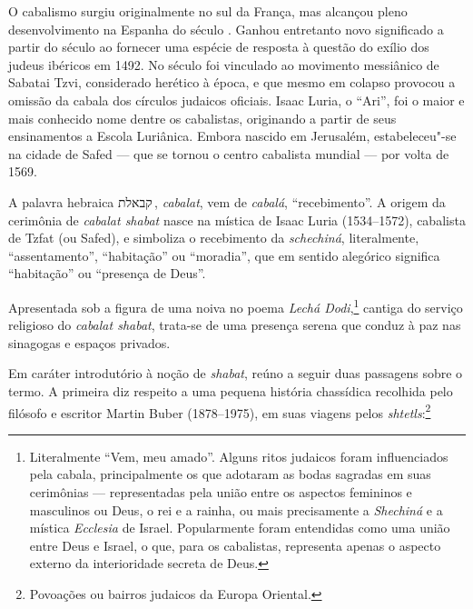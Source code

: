 O cabalismo surgiu originalmente no sul da França, mas alcançou pleno
desenvolvimento na Espanha do século .  Ganhou entretanto
novo significado a partir do século  ao fornecer uma
espécie de resposta à questão do exílio dos judeus ibéricos em 1492. No
século  foi vinculado ao movimento messiânico de Sabatai
Tzvi, considerado herético à época, e que mesmo em colapso provocou a
omissão da cabala dos círculos judaicos oficiais.  Isaac Luria, o
``Ari'', foi o maior e mais conhecido nome dentre os cabalistas,
originando a partir de seus ensinamentos a Escola Luriânica. Embora
nascido em Jerusalém, estabeleceu"-se na cidade de Safed --- que se
tornou o centro cabalista mundial --- por volta de 1569. 

A palavra hebraica קבאלת\,, 
\emph{cabalat}, vem de \emph{cabalá}, ``recebimento''. A
origem da cerimônia de \emph{cabalat shabat} nasce na mística de Isaac Luria (1534--1572),
cabalista de Tzfat (ou Safed), e simboliza o recebimento
da \emph{schechiná}, literalmente, ``assentamento'', ``habitação'' ou ``moradia'', que 
em sentido alegórico significa ``habitação'' ou ``presença de Deus''. 

Apresentada sob a figura de uma noiva no poema \emph{Lechá Dodi},\footnote{Literalmente ``Vem, meu amado''. Alguns ritos judaicos foram influenciados pela cabala, principalmente os que adotaram as bodas sagradas em suas cerimônias --- representadas pela união entre os aspectos femininos e masculinos ou Deus, o rei e a rainha, ou mais precisamente a \emph{Shechiná} e a mística \emph{Ecclesia} de Israel. Popularmente foram entendidas como uma união entre Deus e Israel, o que, para os cabalistas, representa apenas o aspecto externo da interioridade secreta de Deus.} cantiga do 
serviço religioso do \textit{cabalat shabat}, trata-se de uma
presença serena que conduz à paz nas sinagogas e espaços privados.

Em caráter introdutório à noção de \emph{shabat}, reúno a seguir duas
passagens sobre o termo. A primeira diz respeito a uma pequena história chassídica 
recolhida pelo filósofo e escritor  
Martin Buber (1878--1975), em suas viagens pelos \emph{shtetls}:\footnote{Povoações ou bairros 
judaicos da Europa Oriental.}

